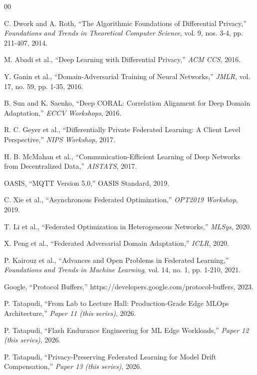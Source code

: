 \documentclass[conference]{IEEEtran}
\begin{document}
\begin{thebibliography}{00}

 C. Dwork and A. Roth, ``The Algorithmic Foundations of Differential Privacy,'' \textit{Foundations and Trends in Theoretical Computer Science}, vol. 9, nos. 3-4, pp. 211-407, 2014.

 M. Abadi et al., ``Deep Learning with Differential Privacy,'' \textit{ACM CCS}, 2016.

 Y. Ganin et al., ``Domain-Adversarial Training of Neural Networks,'' \textit{JMLR}, vol. 17, no. 59, pp. 1-35, 2016.

 B. Sun and K. Saenko, ``Deep CORAL: Correlation Alignment for Deep Domain Adaptation,'' \textit{ECCV Workshops}, 2016.

 R. C. Geyer et al., ``Differentially Private Federated Learning: A Client Level Perspective,'' \textit{NIPS Workshop}, 2017.

 H. B. McMahan et al., ``Communication-Efficient Learning of Deep Networks from Decentralized Data,'' \textit{AISTATS}, 2017.

 OASIS, ``MQTT Version 5.0,'' OASIS Standard, 2019.

 C. Xie et al., ``Asynchronous Federated Optimization,'' \textit{OPT2019 Workshop}, 2019.

 T. Li et al., ``Federated Optimization in Heterogeneous Networks,'' \textit{MLSys}, 2020.

 X. Peng et al., ``Federated Adversarial Domain Adaptation,'' \textit{ICLR}, 2020.

 P. Kairouz et al., ``Advances and Open Problems in Federated Learning,'' \textit{Foundations and Trends in Machine Learning}, vol. 14, no. 1, pp. 1-210, 2021.

 Google, ``Protocol Buffers,'' https://developers.google.com/protocol-buffers, 2023.

 P. Tatapudi, ``From Lab to Lecture Hall: Production-Grade Edge MLOps Architecture,'' \textit{Paper 11 (this series)}, 2026.

 P. Tatapudi, ``Flash Endurance Engineering for ML Edge Workloads,'' \textit{Paper 12 (this series)}, 2026.

 P. Tatapudi, ``Privacy-Preserving Federated Learning for Model Drift Compensation,'' \textit{Paper 13 (this series)}, 2026.

\end{thebibliography}
\end{document}
